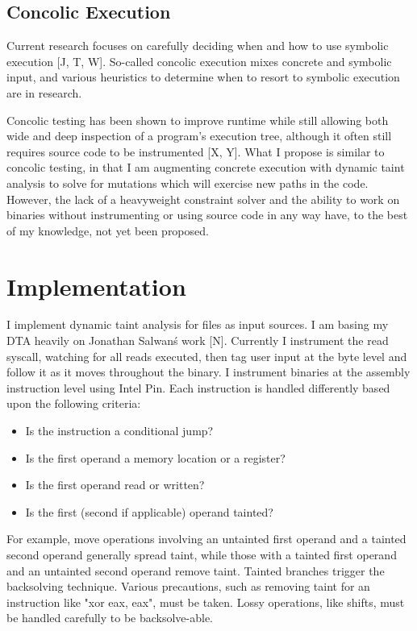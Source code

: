 \documentclass[11pt,expanded,copyright]{fsuthesis}
\begin{document}
\section{Concolic Execution}

Current research focuses on carefully deciding when and how to use symbolic execution [J, T, W]. So-called concolic execution mixes concrete and symbolic input, and various heuristics to determine when to resort to symbolic execution are in research.

Concolic testing has been shown to improve runtime while still allowing both wide and deep inspection of a program's execution tree, although it often still requires source code to be instrumented [X, Y]. What I propose is similar to concolic testing, in that I am augmenting concrete execution with dynamic taint analysis to solve for mutations which will exercise new paths in the code. However, the lack of a heavyweight constraint solver and the ability to work on binaries without instrumenting or using source code in any way have, to the best of my knowledge, not yet been proposed.

\chapter{Implementation}

I implement dynamic taint analysis for files as input sources. I am basing my DTA heavily on Jonathan Salwan\'s work [N]. Currently I instrument the read syscall, watching for all reads executed, then tag user input at the byte level and follow it as it moves throughout the binary. I instrument binaries at the assembly instruction level using Intel Pin. Each instruction is handled differently based upon the following criteria:

\begin{itemize}
	\item Is the instruction a conditional jump?
	\item Is the first operand a memory location or a register?
	\item Is the first operand read or written?
	\item Is the first (second if applicable) operand tainted?
\end{itemize}
	
For example, move operations involving an untainted first operand and a tainted second operand generally spread taint, while those with a tainted first operand and an untainted second operand remove taint. Tainted branches trigger the backsolving technique. Various precautions, such as removing taint for an instruction like "xor eax, eax", must be taken. Lossy operations, like shifts, must be handled carefully to be backsolve-able.
	
\end{document}

